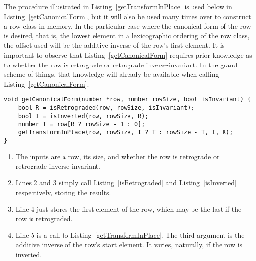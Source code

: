 The procedure illustrated in Listing~\ref{getTransformInPlace} is used below in Listing~\ref{getCanonicalForm}, but it will also be used many times over to construct a row class in memory. In the particular case where the canonical form of the row is desired, that is, the lowest element in a lexicographic ordering of the row class, the offset used will be the additive inverse of the row's first element. It is important to observe that Listing~\ref{getCanonicalForm} requires prior knowledge as to whether the row is retrograde or retrograde inverse-invariant. In the grand scheme of things, that knowledge will already be available when calling Listing~\ref{getCanonicalForm}.

\begin{lstlisting}[caption={Transforming a row into its canonical form.},label={getCanonicalForm}]
void getCanonicalForm(number *row, number rowSize, bool isInvariant) {
    bool R = isRetrograded(row, rowSize, isInvariant);
    bool I = isInverted(row, rowSize, R);
    number T = row[R ? rowSize - 1 : 0];
    getTransformInPlace(row, rowSize, I ? T : rowSize - T, I, R);
}
\end{lstlisting}

\begin{enumerate}
\item The inputs are a row, its size, and whether the row is retrograde or retrograde inverse-invariant.
\item Lines 2 and 3 simply call Listing~\ref{isRetrograded} and Listing~\ref{isInverted} respectively, storing the results.
\addtocounter{enumi}{1}
\item Line 4 just stores the first element of the row, which may be the last if the row is retrograded.
\item Line 5 is a call to Listing~\ref{getTransformInPlace}. The third argument is the additive inverse of the row's start element. It varies, naturally, if the row is inverted.
\end{enumerate}

